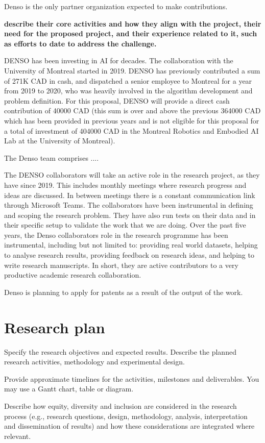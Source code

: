 \documentclass[english,
]{nserc-alliance}
\begin{document}
Denso is the only partner organization expected to make contributions.

\textbf{describe their core activities and how they align with the project, their need for the proposed project, and their experience related to it, such as efforts to date to address the challenge.}

DENSO has been investing in AI for decades. The collaboration with the University of Montreal started in 2019.
DENSO has previously contributed a sum of 271K CAD in cash, and dispatched a senior employee to Montreal for a
year from 2019 to 2020, who was heavily involved in the algorithm development and problem definition.
For this proposal, DENSO will provide a direct cash contribution of 40000 CAD (this sum is over and
above the previous 364000 CAD which has been provided in previous years and is not eligible for
this proposal for a total of investment of  404000 CAD in the Montreal Robotics and Embodied AI Lab at the University of Montreal).

The Denso team comprises ....

The DENSO collaborators will take an active role in the research project, as they have since 2019. This includes monthly meetings where research progress and ideas are discussed. In between meetings there is a constant communication link through Microsoft Teams. The collaborators have been instrumental in defining and scoping the research problem. They have also run tests on their data and in their specific setup to validate the work that we are doing. Over the past five years, the Denso collaborators role in the research programme has been instrumental, including but not limited to: providing real world datasets, helping to analyse research results, providing feedback on research ideas, and helping to write research manuscripts. In short, they are active contributors to a very productive academic research collaboration.  


Denso is planning to apply for patents as a result of the output of the work. 

\section*{Research plan}
\ifinst\begin{instructions}
  \item Specify the research objectives and expected results. Describe the planned research activities, methodology and experimental design.
  \item Provide approximate timelines for the activities, milestones and deliverables. You may use a Gantt chart, table or diagram.
  \item Describe how equity, diversity and inclusion are considered in the research process (e.g., research questions, design, methodology, analysis, interpretation and dissemination of results) and how these considerations are integrated where relevant.
\end{instructions}\fi
\end{document}
